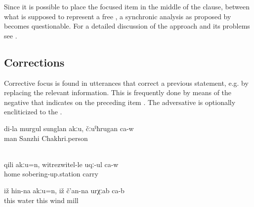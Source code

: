 Since it is possible to place the focused item in the middle of the clause, between what is supposed to represent a free , a synchronic  analysis as proposed by \citet{Kazenin2002} becomes questionable. For a detailed discussion of the  approach and its problems see \citet{Forker2016a}.


\subsection{Corrections}
\label{ssec:Corrections}

Corrective focus is found in utterances that correct a previous statement, e.g. by replacing the relevant information. This is frequently done by means of the negative   that indicates  on the preceding item . The adversative   is optionally encliticized to the .
%
\begin{exe}
	\ex	\label{ex:‎My husband is not Sanzhi, he is Chakhri}
	\gll	di-la	murgul	sunglan	akːu,		čːuˁħrugan	ca-w\\
			man	Sanzhi		Chakhri.person	\\
	\glt	{}

	\\\label{ex:No, not home, they take him to the sobering-up station@28}%
	\gll	qili	akːu=n,	witrezwitel-le	uqː-ul	ca-w\\
		home		sobering-up.station	carry	\\
	\glt	{}

	\ex	\label{ex:‎This is not a water, this is a wind mill}
	\gll	iž	hin-na	akːu=n,	iž	č'an-na	urχːab	ca-b\\
		this	water		this	wind	mill	\\
	\glt	{}
\end{exe}

